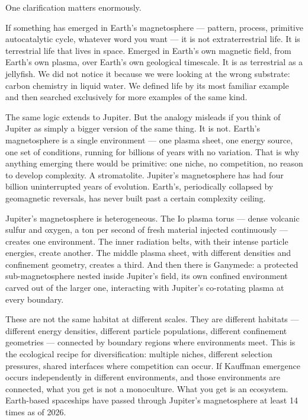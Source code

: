 One clarification matters enormously.

If something has emerged in Earth's magnetosphere --- pattern, process, primitive autocatalytic cycle, whatever word you want --- it is not extraterrestrial life. It is terrestrial life that lives in space. Emerged in Earth's own magnetic field, from Earth's own plasma, over Earth's own geological timescale. It is as terrestrial as a jellyfish. We did not notice it because we were looking at the wrong substrate: carbon chemistry in liquid water. We defined life by its most familiar example and then searched exclusively for more examples of the same kind.

The same logic extends to Jupiter. But the analogy misleads if you think of Jupiter as simply a bigger version of the same thing. It is not. Earth's magnetosphere is a single environment --- one plasma sheet, one energy source, one set of conditions, running for billions of years with no variation. That is why anything emerging there would be primitive: one niche, no competition, no reason to develop complexity. A stromatolite. Jupiter's magnetosphere has had four billion uninterrupted years of evolution. Earth's, periodically collapsed by geomagnetic reversals, has never built past a certain complexity ceiling.

Jupiter's magnetosphere is heterogeneous. The Io plasma torus --- dense volcanic sulfur and oxygen, a ton per second of fresh material injected continuously --- creates one environment. The inner radiation belts, with their intense particle energies, create another. The middle plasma sheet, with different densities and confinement geometry, creates a third. And then there is Ganymede: a protected sub-magnetosphere nested inside Jupiter's field, its own confined environment carved out of the larger one, interacting with Jupiter's co-rotating plasma at every boundary.

These are not the same habitat at different scales. They are different habitats --- different energy densities, different particle populations, different confinement geometries --- connected by boundary regions where environments meet. This is the ecological recipe for diversification: multiple niches, different selection pressures, shared interfaces where competition can occur. If Kauffman emergence occurs independently in different environments, and those environments are connected, what you get is not a monoculture. What you get is an ecosystem. Earth-based spaceships have passed through Jupiter's magnetosphere at least 14 times as of 2026.

